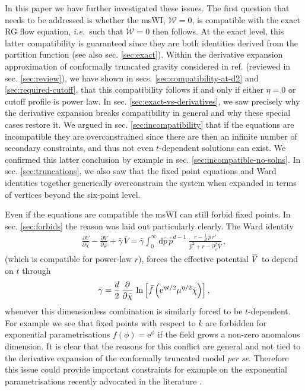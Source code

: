 \documentclass[11pt]{book} %
\newcommand{\overbar}[1]{\mkern 1.5mu\overline{\mkern-1.5mu#1\mkern-1.5mu}\mkern 1.5mu}
\newcommand{\bV}{\overbar V}
\newcommand\ie{\textit{i.e.}\ }
\newcommand{\bc}{\bar \chi}
\numberwithin{equation}{chapter}
\begin{document}
{In this paper we have further investigated these issues.
The first question that needs to be addressed is whether the msWI,
$\mathcal{W}=0$, is compatible with the exact RG flow equation, \ie such that $\dot{\mathcal{W}}=0$ then follows.
At the exact level, this latter compatibility is guaranteed since they are both identities derived from the
partition function (see also sec. \ref{sec:exact}).
Within the derivative expansion approximation of conformally truncated gravity considered in ref.
\cite{Dietz:2015owa} (reviewed in sec. \ref{sec:review}),
we have shown  in secs. \ref{sec:compatibility-at-d2} and \ref{sec:required-cutoff},
that this compatibility follows if and only if either $\eta=0$ or cutoff profile is power law.
In sec. \ref{sec:exact-vs-derivatives}, we saw precisely why the derivative expansion breaks compatibility
in general and why these special cases restore it.
We argued in sec. \ref{sec:incompatibility} that if the equations are incompatible they are overconstrained
since there are then an infinite number of secondary constraints,
and thus not even $t$-dependent solutions can exist.
We confirmed this latter conclusion by example in sec. \ref{sec:incompatible-no-solns}.
In sec. \ref{sec:truncations},
we also saw that the fixed point equations and Ward identities together generically overconstrain the
system when expanded in terms of vertices beyond the six-point level.

Even if the equations are compatible the msWI can still forbid fixed points.
In sec. \ref{sec:forbids} the reason was laid out particularly clearly. The Ward identity
\begin{align}
  \frac{\partial \bar V}{\partial \bar\chi} - \frac{\partial \bar V}{\partial \bar\varphi} + \bar \gamma \, \bar V = \bar \gamma
  \int_0^{\infty} \mathrm d\hat p \, \hat p^{d-1} \; \frac{r - \frac{1}{d} \, \hat p \, r'}{\hat p^2 + r - \partial^2_{\bar\varphi}\bar V} \,,
\end{align}
(which is compatible for power-law $r$),
forces the effective potential $\bV$ to depend on $t$ through
\begin{align}
  \bar{\gamma} = \frac{d}{2} \, \frac{\partial}{\partial\bc} \,
  \ln \left[ \bar{f} \left({\rm e}^{\eta t/2}\mu^{\eta/2}\bc \right) \right] ,
\end{align}
whenever this dimensionless combination is similarly forced to be $t$-dependent.
For example we see that fixed points with respect to $k$ are forbidden for exponential parametrisations
$f(\phi) = \mathrm e ^ \phi$  if the field grows a non-zero anomalous dimension.
It is clear that the reasons for this conflict are general and not tied to the derivative expansion
of the conformally truncated model \textit{per se}.
Therefore this issue could provide important constraints for example on the exponential parametrisations
recently advocated in the literature
\cite{Demmel:2015zfa,Eichhorn:2013xr,Eichhorn:2015bna,Nink:2014yya,Percacci:2015wwa,
Ohta:2015efa,Gies:2015tca}.

}
\end{document}
